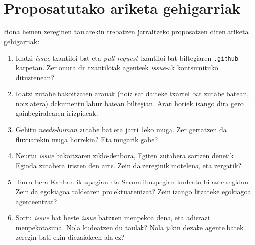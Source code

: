 
\section{Proposatutako ariketa gehigarriak}

Hona hemen zereginen taularekin trebatzen jarraitzeko proposatzen diren ariketa gehigarriak:

\begin{enumerate}

    \item Idatzi \textit{issue}-txantiloi bat eta \textit{pull request}-txantiloi bat biltegiaren \verb|.github| karpetan. Zer onura du txantiloiak agenteek \textit{issue}-ak kontsumituko dituztenean?
    \vspace{0.25cm}
    \item Idatzi zutabe bakoitzaren arauak (noiz sar daiteke txartel bat zutabe batean, noiz atera) dokumentu labur batean biltegian. Arau horiek izango dira gero gainbegiralearen irizpideak.
    \vspace{0.25cm}
    \item Gehitu \textit{needs-human} zutabe bat eta jarri 1eko muga. Zer gertatzen da fluxuarekin muga horrekin? Eta mugarik gabe?
    \vspace{0.25cm}
    \item Neurtu \textit{issue} bakoitzaren ziklo-denbora, Egiten zutabera sartzen denetik Eginda zutabera iristen den arte. Zein da zereginik motelena, eta zergatik?
    \vspace{0.25cm}
    \item Taula bera Kanban ikuspegian eta Scrum ikuspegian kudeatu bi aste segidan. Zein da egokiagoa taldearen proiektuarentzat? Zein izango litzateke egokiagoa agenteentzat?
    \vspace{0.25cm}
    \item Sortu \textit{issue} bat beste \textit{issue} batzuen menpekoa dena, eta adierazi menpekotasuna. Nola kudeatzen du taulak? Nola jakin dezake agente batek zeregin bati ekin diezaiokeen ala ez?

\end{enumerate}
